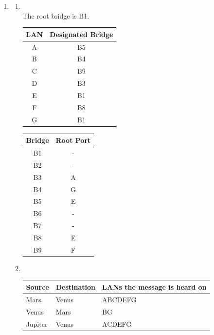 \documentclass[10pt, a4paper]{article}
\begin{document}
\begin{enumerate}
\item\mbox{}
    \begin{enumerate}
    \item\mbox{}\\
        The root bridge is B1.\\
        \begin{tabular}{cc}
            \toprule
            LAN & Designated Bridge\\
            \hline
            A & B5\\
            B & B4\\
            C & B9\\
            D & B3\\
            E & B1\\
            F & B8\\
            G & B1\\
            \bottomrule
        \end{tabular}
        \qquad
        \begin{tabular}{cc}
            \toprule
            Bridge & Root Port\\
            \hline
            B1 & -\\
            B2 & -\\
            B3 & A\\
            B4 & G\\
            B5 & E\\
            B6 & -\\
            B7 & -\\
            B8 & E\\
            B9 & F\\
            \bottomrule
        \end{tabular}
    \item\mbox{}\\
        \begin{tabular}{lll}
            \toprule
            Source & Destination & LANs the message is heard on\\
            \hline
            Mars & Venus & ABCDEFG\\
            Venus & Mars & BG\\
            Jupiter & Venus & ACDEFG\\
            \bottomrule
        \end{tabular}
    \end{enumerate}


\end{enumerate}
\end{document}
